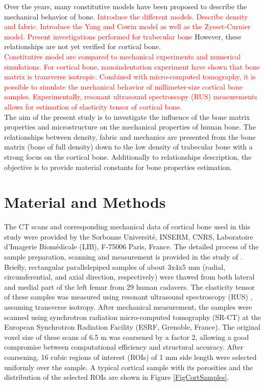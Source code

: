 \documentclass[a4paper,fleqn]{DC_ArtStyle}
\begin{document}
	Over the years, many constitutive models have been proposed to describe the mechanical behavior of bone.
	\textcolor{red}{
	Introduce the different models.
	Describe density and fabric.
	Introduce the Yang and Cowin model as well as the Zysset-Curnier model.
	Present investigations performed for trabecular bone}
	However, these relationships are not yet verified for cortical bone.\\

	\textcolor{red}{
	Constitutive model are compared to mechanical experiments and numerical simulations.
	For cortical bone, nanoindentation experiment have shown that bone matrix is transverse isotropic.
	Combined with micro-computed tomography, it is possible to simulate the mechanical behavior of millimeter-size cortical bone samples.
	Experimentally, resonant ultrasound spectroscopy (RUS) measurements allows for estimation of elasticity tensor of cortical bone.
	}\\

	The aim of the present study is to investigate the influence of the bone matrix properties and microstructure on the mechanical properties of human bone.
	The relationships between density, fabric and mechanics are presented from the bone matrix (bone of full density) down to the low density of trabecular bone with a strong focus on the cortical bone.
	Additionally to relationships description, the objective is to provide material constants for bone properties estimation.

	
	\newpage
	\section{Material and Methods}
	The \textmu CT scans and corresponding mechanical data of cortical bone used in this study were provided by the Sorbonne Université, INSERM, CNRS, Laboratoire d'Imagerie Biomédicale (LIB), F-75006 Paris, France.
	The detailed process of the sample preparation, scanning and measurement is provided in the study of \citeauthor{Cai2019AnisotropicEP}\cite{Cai2019AnisotropicEP}.
	Briefly, rectangular parallelepiped samples of about 3x4x5 mm (radial, circumferential, and axial direction, respectively) were thawed from both lateral and medial part of the left femur from 29 human cadavers.
	The elasticity tensor of these samples was measured using resonant ultrasound spectroscopy (RUS) \cite{Bernard2013AccurateMO}, assuming transverse isotropy.
	After mechanical measurement, the samples were scanned using synchrotron radiation micro-computed tomography (SR-\textmu CT) at the European Synchrotron Radiation Facility (ESRF, Grenoble, France).
	The original voxel size of these scans of 6.5 \textmu m was coarsened by a factor 2, allowing a good compromise between computational efficiency and structural accuracy.
	After coarsening, 16 cubic regions of interest (ROIs) of 1 mm side length were selected uniformly over the sample.
	A typical cortical sample with its porosities and the distribution of the selected ROIs are shown in Figure \ref{FigCortSamples}.
\end{document}
